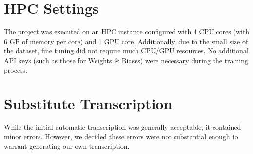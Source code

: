 \documentclass[12pt]{article}
\begin{document}
\section{HPC Settings}
The project was executed on an HPC instance configured with 4 CPU cores (with 6 GB of memory per core) and 1 GPU core. Additionally, due to the small size of the dataset, fine tuning did not require much CPU/GPU resources. No additional API keys (such as those for Weights \& Biases) were necessary during the training process.

\section{Substitute Transcription}
While the initial automatic transcription was generally acceptable, it contained minor errors. However, we decided these errors were not substantial enough to warrant generating our own transcription.
\end{document}
